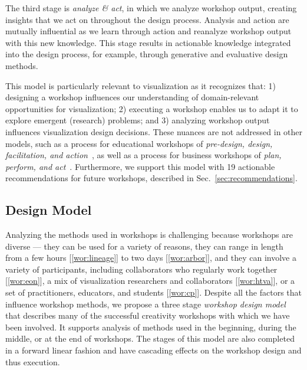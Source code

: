 The third stage is \emph{analyze \& act}, in which we analyze workshop output, creating insights that we act on throughout the design process. Analysis and action are mutually influential as we learn through action and reanalyze workshop output with this new knowledge. This stage results in actionable knowledge integrated into the design process, for example, through generative and evaluative design methods. 

This model is particularly relevant to visualization as it recognizes that: 1) designing a workshop influences our understanding of domain-relevant opportunities for visualization; 2) executing a workshop enables us to adapt it to explore emergent (research) problems; and 3) analyzing workshop output influences visualization design decisions. These nuances are not addressed in other models, such as a process for educational workshops of \emph{pre-design, design, facilitation, and action}~\cite{Brooks-Harris1999}, as well as a process for business workshops of \emph{plan, perform, and act}~\cite{Hamilton2016}. Furthermore, we support this model with 19 actionable recommendations for future workshops, described in Sec.~\ref{sec:recommendations}.

\subsection{Design Model}

Analyzing the methods used in workshops is challenging because workshops are diverse --- they can be used for a variety of reasons, they can range in length from a few hours [\ref{wor:lineage}] to two days [\ref{wor:arbor}], and they can involve a variety of participants, including collaborators who regularly work together [\ref{wor:eon}], a mix of visualization researchers and collaborators [\ref{wor:htva}], or a set of practitioners, educators, and students [\ref{wor:cp}]. Despite all the factors that influence workshop methods, we propose a three stage \emph{workshop design model} that describes many of the successful creativity workshops with which we have been involved. It supports analysis of methods used in the beginning, during the middle, or at the end of workshops. The stages of this model are also completed in a forward linear fashion and have cascading effects on the workshop design and thus execution. 


